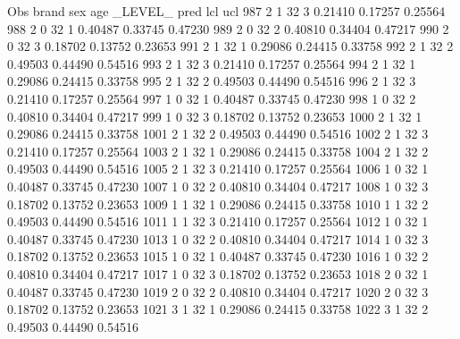 \documentclass{article}
\begin{document}
\begin{Woutput}
 Obs    brand    sex    age    _LEVEL_      pred       lcl        ucl
 987      2       1      32       3       0.21410    0.17257    0.25564
 988      2       0      32       1       0.40487    0.33745    0.47230
 989      2       0      32       2       0.40810    0.34404    0.47217
 990      2       0      32       3       0.18702    0.13752    0.23653
 991      2       1      32       1       0.29086    0.24415    0.33758
 992      2       1      32       2       0.49503    0.44490    0.54516
 993      2       1      32       3       0.21410    0.17257    0.25564
 994      2       1      32       1       0.29086    0.24415    0.33758
 995      2       1      32       2       0.49503    0.44490    0.54516
 996      2       1      32       3       0.21410    0.17257    0.25564
 997      1       0      32       1       0.40487    0.33745    0.47230
 998      1       0      32       2       0.40810    0.34404    0.47217
 999      1       0      32       3       0.18702    0.13752    0.23653
1000      2       1      32       1       0.29086    0.24415    0.33758
1001      2       1      32       2       0.49503    0.44490    0.54516
1002      2       1      32       3       0.21410    0.17257    0.25564
1003      2       1      32       1       0.29086    0.24415    0.33758
1004      2       1      32       2       0.49503    0.44490    0.54516
1005      2       1      32       3       0.21410    0.17257    0.25564
1006      1       0      32       1       0.40487    0.33745    0.47230
1007      1       0      32       2       0.40810    0.34404    0.47217
1008      1       0      32       3       0.18702    0.13752    0.23653
1009      1       1      32       1       0.29086    0.24415    0.33758
1010      1       1      32       2       0.49503    0.44490    0.54516
1011      1       1      32       3       0.21410    0.17257    0.25564
1012      1       0      32       1       0.40487    0.33745    0.47230
1013      1       0      32       2       0.40810    0.34404    0.47217
1014      1       0      32       3       0.18702    0.13752    0.23653
1015      1       0      32       1       0.40487    0.33745    0.47230
1016      1       0      32       2       0.40810    0.34404    0.47217
1017      1       0      32       3       0.18702    0.13752    0.23653
1018      2       0      32       1       0.40487    0.33745    0.47230
1019      2       0      32       2       0.40810    0.34404    0.47217
1020      2       0      32       3       0.18702    0.13752    0.23653
1021      3       1      32       1       0.29086    0.24415    0.33758
1022      3       1      32       2       0.49503    0.44490    0.54516

\end{Woutput}
\end{document}
